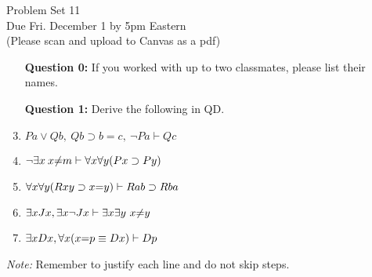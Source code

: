 \documentclass[12pt]{article}
\def\eif{\ensuremath{\supset}}
\def\eiff{\ensuremath{\equiv}}
\begin{document}
% 
% 

\thispagestyle{empty}



\begin{center}
\Large Problem Set 11\\[1ex] 
 Due Fri. December 1 by 5pm Eastern\\ 
  \vspace{.1in}
  \normalsize{(Please scan and upload to Canvas as a pdf)} \\[3ex] 
\end{center}


\begin{enumerate}[leftmargin=.75in]
  \item[\bf Question 0:] If you worked with up to two classmates, please list their names.
  \item[\bf Question 1:] Derive the following in QD.
  \item $Pa \vee Qb,\ Qb \supset b = c,\ \neg Pa \vdash Qc$
  \item $\neg \qt{\exists}{x} \: x {\neq} m \vdash \qt{\forall}{x}\qt{\forall}{y} (Px \eif Py)$
  \item $\qt{\forall}{x}\qt{\forall}{y}(Rxy \eif x{=}y)\vdash Rab \eif Rba$
  \item $\exists x Jx, \exists x \neg Jx\vdash \exists x \exists y\ x{\neq} y$
  \item $\qt{\exists}{x} Dx, \qt{\forall}{x}(x{=}p \eiff Dx)\vdash Dp$
\end{enumerate}

\textit{Note:} Remember to justify each line and do not skip steps.
\end{document}
